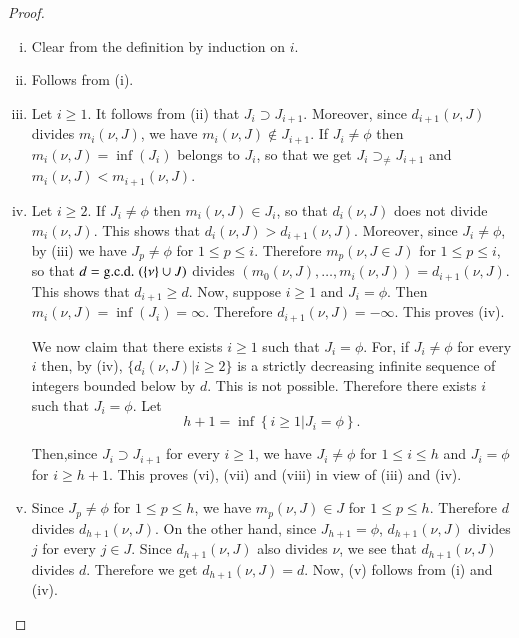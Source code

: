 \begin{proof}
~
\begin{enumerate}[(i)]
\item Clear from the definition by induction on $i$.

\item Follows from (i).

\item Let $i \geq 1$. It follows from (ii) that $J_i \supset J_{i+1}$. Moreover, since $d_{i+1}(\nu, J)$ divides $m_i (\nu, J)$, we have $m_i(\nu, J) \notin J_{i+1}$. If $J_i \neq \phi$ then $m_i (\nu, J) = \inf (J_i)$ belongs to $J_i$, so that we get $J_i \displaystyle{\mathop{\supset}_{\neq}} J_{i+1}$ and $m_i (\nu, J) < m_{i+1} (\nu, J)$.

\item Let $i \geq 2$. If $J_i \neq \phi$ then $m_i (\nu, J) \in J_i$, so that $d_i(\nu, J)$ does not divide $m_i (\nu, J)$. This shows that $d_i (\nu, J)> d_{i+1} (\nu, J)$. Moreover, since $J_i \neq \phi$, by (iii) we have $J_p \neq \phi$ for $1 \leq p \leq i$. Therefore $m_p (\nu, J \in J)$ for $1 \leq p \leq i$, so that $d= \text{\gcd} (\{ \nu\} \cup J)$ divides \gcd $(m_0 (\nu, J), \ldots , m_i (\nu , J)) = d_{i+1} (\nu, J)$. This shows that $d_{i+1} \geq d$.  Now, suppose $i \geq 1$ and $J_i = \phi$. Then $m_i (\nu, J)= \inf (J_i) = \infty$. Therefore $d_{i+1}(\nu, J)=- \infty$. This proves (iv).

We now claim that there exists $i \geq 1$ such that $J_i = \phi$. For, if $J_i \neq\phi$ for every $i$ then, by (iv), $\{ d_i (\nu, J)|i \geq 2\}$ is a strictly decreasing infinite sequence of integers bounded below by $d$. This is not possible. Therefore there exists $i$ such that $J_i = \phi$. Let
$$
h+1 = \inf \left\{ i \geq 1 \Big| J_i = \phi \right\}.
$$

Then,\pageoriginale since $J_i \supset J_{i+1}$ for every $i \geq 1$, we have $J_i \neq \phi$ for $1\leq i \leq h$ and $J_i = \phi$ for $i \geq h+1$. This proves (vi), (vii) and (viii) in view of (iii) and (iv).

\item Since $J_p \neq \phi$ for $1 \leq p \leq h$, we have $m_p (\nu, J) \in J$ for $1 \leq p \leq h$. Therefore $d$ divides $d_{h+1}(\nu, J)$. On the other hand, since $J_{h+1}= \phi$, $d_{h+1} (\nu, J)$ divides $j$ for every $j \in J$. Since $d_{h+1}(\nu, J)$ also divides $\nu$, we see that $d_{h+1}(\nu, J)$ divides $d$. Therefore we get $d_{h+1}(\nu, J)=d$. Now, (v) follows from (i) and (iv).


\end{enumerate}
\end{proof}
